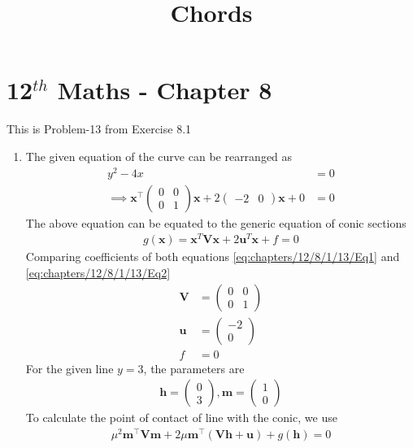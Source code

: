 \documentclass[12pt]{article}
\providecommand{\brak}[1]{\ensuremath{\left(#1\right)}}
\newcommand{\solution}{\noindent \textbf{Solution: }}
\newcommand{\myvec}[1]{\ensuremath{\begin{pmatrix}#1\end{pmatrix}}}
\let\vec\mathbf
\begin{document}
\begin{center}
\title{\textbf{Chords}}
\date{\vspace{-5ex}} %
\maketitle
\end{center}
\setcounter{page}{1}

\section{12$^{th}$ Maths - Chapter 8}
This is Problem-13 from Exercise 8.1 
\begin{enumerate}

\solution 
\item 
	\fi
	The given equation of the curve can be rearranged as
\begin{align}
	y^2-4x &= 0 \\
        \label{eq:chapters/12/8/1/13/Eq1}
	\implies \vec{x}^\top\myvec{0 & 0 \\ 0 & 1}\vec{x} + 2\myvec{-2 & 0}\vec{x}+0 &= 0 
\end{align}
The above equation can be equated to the generic equation of conic sections
\begin{align}
	\label{eq:chapters/12/8/1/13/Eq2}
	g\brak{\vec{x}} = \vec{x}^T\vec{V}\vec{x} + 2\vec{u}^T\vec{x} + f = 0 
\end{align}
Comparing coefficients of both equations \eqref{eq:chapters/12/8/1/13/Eq1} and \eqref{eq:chapters/12/8/1/13/Eq2} 
\begin{align}
	\vec{V} &= \myvec{ 0 & 0 \\ 0 & 1} \\
	\vec{u} &= \myvec{-2 \\ 0} \\
	f &= 0
\end{align}
For the given line $y=3$, the parameters are
\begin{align}
	\vec{h} = \myvec{0 \\ 3} , \vec{m} = \myvec{1 \\ 0 }
\end{align}
To calculate the point of contact of line with the conic, we use
\begin{align}
	\label{eq:chapters/12/8/1/13/Eq3}
	\mu^2\vec{m}^\top\vec{V}\vec{m}+2\mu\vec{m}^\top\brak{\vec{V}\vec{h}+\vec{u}}+g\brak{\vec{h}}= 0 
\end{align}
\begin{multline}

\end{multline}
\end{enumerate}
\end{document}
